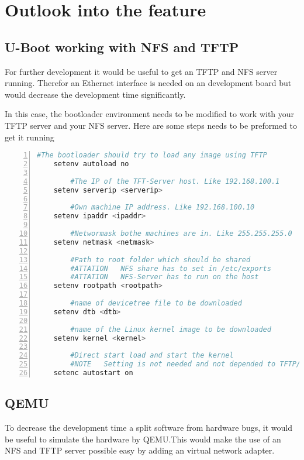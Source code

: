 
\chapter{Outlook into the feature}%
\label{cha:ausblick}


\section{U-Boot working with NFS and TFTP}%
\label{sec:uboot_nfstftp}

For further development it would be useful to get an TFTP and NFS server
running. Therefor an Ethernet interface is needed on an development board but
would decrease the development time significantly.

In this case, the bootloader environment needs to be modified to work with your
\gls{TFTP} server and your \gls{NFS} server. Here are some steps needs to be
preformed to get it running

\newpage

\begin{lstlisting}[gobble=4, language=bash,numbers=left,caption=Configure
bootboloader (Barebox or U-Boot) to use NTFS and TFTP.]
         #The bootloader should try to load any image using TFTP
    setenv autoload no

        #The IP of the TFT-Server host. Like 192.168.100.1
    setenv serverip <serverip>

        #Own machine IP address. Like 192.168.100.10
    setenv ipaddr <ipaddr>

        #Networmask bothe machines are in. Like 255.255.255.0
    setenv netmask <netmask>

        #Path to root folder which should be shared
        #ATTATION   NFS share has to set in /etc/exports
        #ATTATION   NFS-Server has to run on the host
    setenv rootpath <rootpath>

        #name of devicetree file to be downloaded
    setenv dtb <dtb>

        #name of the Linux kernel image to be downloaded
    setenv kernel <kernel>

        #Direct start load and start the kernel
        #NOTE   Setting is not needed and not depended to TFTP/NFS
    setenc autostart on

\end{lstlisting}

\newpage

\section{QEMU}%
\label{sec:QEMU}
To decrease the development time a split software from hardware bugs, it would
be useful to simulate the hardware by QEMU.\@ This would make the use of an NFS
and TFTP server possible easy by adding an virtual network adapter.
